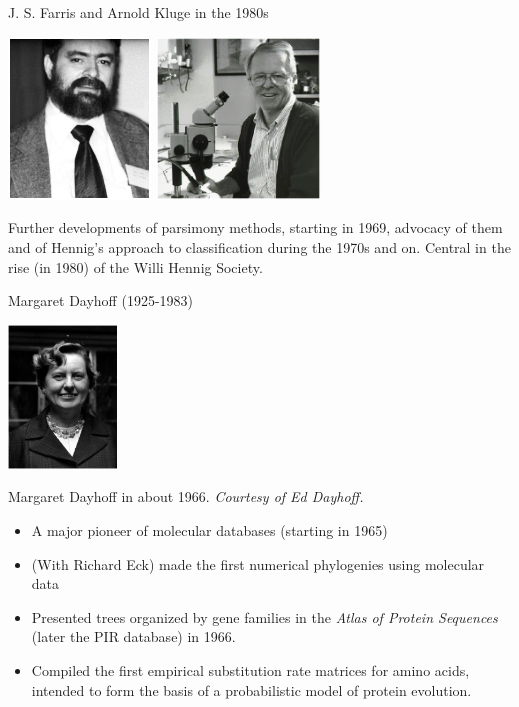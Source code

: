 \documentclass[pdf,bluish,slideColor,colorBG]{prosper}
\begin{document}
\begin{slide}[Replace]{J. S. Farris and Arnold Kluge in the 1980s}

\begin{center}
\includegraphics[height=1.7in]{Farris3b.ps} \includegraphics[height=1.7in]{kluge.ps}
\end{center}
\medskip

Further developments of parsimony methods, starting in 1969, advocacy of them and of Hennig's
approach to classification during the 1970s and on.  Central in the rise (in 1980) of the Willi Hennig Society.

\end{slide}

\begin{slide}[Replace]{Margaret Dayhoff (1925-1983)}
\centerline{\includegraphics[height=1.5in]{dayhoff2.ps}}
\medskip

\centerline{Margaret Dayhoff in about 1966. {\it Courtesy of Ed Dayhoff.}}
\medskip

{
\begin{itemize}
\item A major pioneer of molecular databases (starting in 1965)
\item (With Richard Eck) made the first numerical phylogenies using molecular data
\item Presented trees organized by gene families in the {\it Atlas of Protein
Sequences} (later the PIR database) in 1966.
\item Compiled the first empirical substitution rate matrices for amino acids,
intended to form the basis of a probabilistic model of protein evolution.
\end{itemize}
}

\end{slide}
\end{document}
